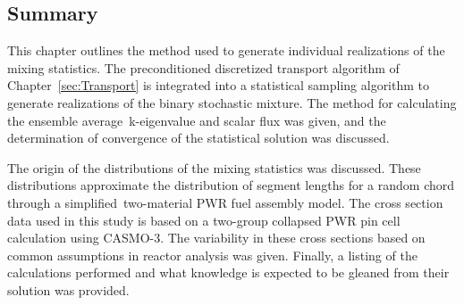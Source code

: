\belowSubSecSkip

\subsection{Summary}
\label{sec:StochMedTrans-Summary}

\noindent
	\indent This chapter outlines the method used to generate individual realizations of the mixing
	statistics.  The preconditioned discretized transport algorithm of Chapter~\ref{sec:Transport}
	is integrated into a statistical sampling algorithm to generate realizations of the binary stochastic mixture.
	The method for calculating the ensemble average~k-eigenvalue and scalar flux was given, and the
	determination of convergence of the statistical solution was discussed.
	
\noindent
	\indent The origin of the distributions of the mixing statistics was discussed.  These
	distributions approximate the distribution of segment
	lengths for a random chord through a simplified~two-material PWR fuel assembly model.  The cross section
	data used in this study 
	is based on a two-group collapsed PWR pin cell calculation using CASMO-3.  The variability in these
	cross sections based on common assumptions in reactor analysis was given.  Finally, a listing of the
	calculations performed and what knowledge is expected to be gleaned from their solution was
	provided.  
	
	
	
	
	
	
	
	
	
	
	
	
	
